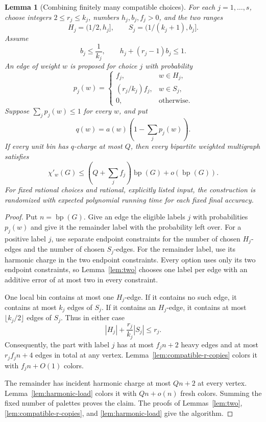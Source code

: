 \documentclass[11pt]{article}
\newtheorem{lemma}[theorem]{Lemma}
\theoremstyle{definition}\newtheorem{algorithm}{Algorithm}[section]
\numberwithin{equation}{section}
\theoremstyle{remark}\newtheorem*{remark}{Remark}
\newcommand{\bp}{\operatorname{bp}}
\begin{document}
\begin{lemma}[Combining finitely many compatible choices]
\label{lem:compatible-modes}
For each $j=1,\ldots,s$, choose integers $2\le r_j\le k_j$, numbers
$h_j,b_j,f_j>0$, and the two ranges
\[
 H_j=(1/2,h_j],\qquad S_j=(1/(k_j+1),b_j].
\]
Assume
\[
 b_j\le\frac1{k_j},\qquad
 h_j+(r_j-1)b_j\le1.
\]
An edge of weight $w$ is proposed for choice $j$ with probability
\[
 p_j(w)=
 \begin{cases}
  f_j,&w\in H_j,\\
  (r_j/k_j)f_j,&w\in S_j,\\
  0,&\text{otherwise}.
 \end{cases}
\]
Suppose $\sum_jp_j(w)\le1$ for every $w$, and put
\[
 q(w)=a(w)\left(1-\sum_jp_j(w)\right).
\]
If every unit bin has $q$-charge at most $Q$, then every bipartite
weighted multigraph satisfies
\[
 \chi'_w(G)\le\left(Q+\sum_jf_j\right)\bp(G)+o(\bp(G)).
\]
For fixed rational choices and rational, explicitly listed input, the
construction is randomized with expected polynomial running time for
each fixed final accuracy.
\end{lemma}
\begin{proof}
Put $n=\bp(G)$.  Give an edge the eligible labels $j$ with probabilities
$p_j(w)$ and give it the remainder label with the probability left over.
For a positive label $j$, use separate endpoint constraints for the
number of chosen $H_j$-edges and the number of chosen $S_j$-edges.  For
the remainder label, use its harmonic charge in the two endpoint
constraints.  Every option uses only its two endpoint constraints, so
Lemma~\ref{lem:two} chooses one label per edge with an additive error of
at most two in every constraint.

One local bin contains at most one $H_j$-edge.  If it contains no such
edge, it contains at most $k_j$ edges of $S_j$.  If it contains an
$H_j$-edge, it contains at most $\lfloor k_j/2\rfloor$ edges of $S_j$.
Thus in either case
\[
 |H_j|+\frac{r_j}{k_j}|S_j|\le r_j.
\]
Consequently, the part with label $j$ has at most $f_jn+2$ heavy edges
and at most $r_jf_jn+4$ edges in total at any vertex.
Lemma~\ref{lem:compatible-r-copies} colors it with $f_jn+O(1)$ colors.

The remainder has incident harmonic charge at most $Qn+2$ at every
vertex.  Lemma~\ref{lem:harmonic-load} colors it with $Qn+o(n)$ fresh
colors.  Summing the fixed number of palettes proves the claim.  The
proofs of Lemmas~\ref{lem:two}, \ref{lem:compatible-r-copies}, and
\ref{lem:harmonic-load} give the algorithm.
\end{proof}
\end{document}

